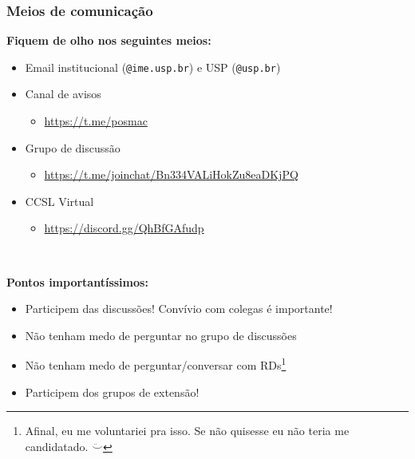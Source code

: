 \documentclass{beamer}
\begin{document}
\begin{frame}
  \frametitle{Meios de comunicação}

  \textbf{Fiquem de olho nos seguintes meios:}
  \begin{itemize}
    \item Email institucional (\texttt{@ime.usp.br}) e USP (\texttt{@usp.br})
    \item Canal de avisos
      \begin{itemize}
        \item \url{https://t.me/posmac}
      \end{itemize}
    \item Grupo de discussão
      \begin{itemize}
        \item \url{https://t.me/joinchat/Bn334VALiHokZu8eaDKjPQ}
      \end{itemize}
    \item CCSL Virtual
      \begin{itemize}
        \item \url{https://discord.gg/QhBfGAfudp}
      \end{itemize}
  \end{itemize}~\\\pause

  \textbf{Pontos importantíssimos:}
  \begin{itemize}
    \item Participem das discussões! Convívio com colegas é importante!
    \item Não tenham medo de perguntar no grupo de discussões
    \item Não tenham medo de perguntar/conversar com RDs\footnote{Afinal, eu me voluntariei pra
      isso. Se não quisesse eu não teria me candidatado. $\ddot\smile$}
    \item Participem dos grupos de extensão!
  \end{itemize}
\end{frame}
\end{document}
